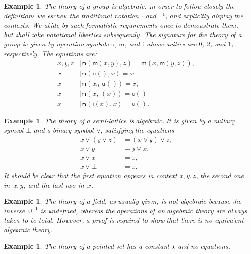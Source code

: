 \documentclass{amsart}
\newtheorem{example}[definition]{Example}
\begin{document}
\begin{example}
  The theory of a group is algebraic. In order to follow closely the definitions we eschew
  the traditional notation $\cdot$ and ${}^{-1}$, and explicitly display the contexts. We
  abide by such formalistic requirements once to demonstrate them, but shall take
  notational liberties subsequently.
  The signature for the theory of a group is given by operation symbols $\mathsf{u}$,
  $\mathsf{m}$, and $\mathsf{i}$ whose arities are $0$, $2$, and $1$, respectively. The
  equations are:
  \begin{align*}
    x, y, z &\mid \mathsf{m}(\mathsf{m}(x, y), z) = \mathsf{m}(x, \mathsf{m}(y, z)),\\
    x &\mid \mathsf{m}(\mathsf{u}(), x) = x \\
    x &\mid \mathsf{m}(x_0, \mathsf{u}()) = x,\\
    x &\mid \mathsf{m}(x, \mathsf{i}(x)) = \mathsf{u}()\\
    x &\mid \mathsf{m}(\mathsf{i}(x), x) = \mathsf{u}().
  \end{align*}
\end{example}

\begin{example}
  \label{ex:semi-lattice}
  The theory of a semi-lattice is algebraic. It is given by a nullary symbol $\bot$ and a
  binary symbol $\vee$, satisfying the equations
  \begin{align*}
    x \vee (y \vee z) &= (x \vee y) \vee z,\\
    x \vee y &= y \vee x,\\
    x \vee x &= x,\\
    x \vee \bot &= x.
  \end{align*}
  It should be clear that the first equation appears in context $x, y, z$, the second one
  in~$x, y$, and the last two in~$x$.
\end{example}

\begin{example}
  \label{ex:field}
  The theory of a field, as usually given, is not algebraic because the inverse~$0^{-1}$
  is undefined, whereas the operations of an algebraic theory are always taken to be
  total. However, a proof is required to show that there is no equivalent algebraic theory.
\end{example}

\begin{example}
  \label{ex:pointed-set}
  The theory of a \emph{pointed set} has a constant $\star$ and no equations.
\end{example}
\end{document}
